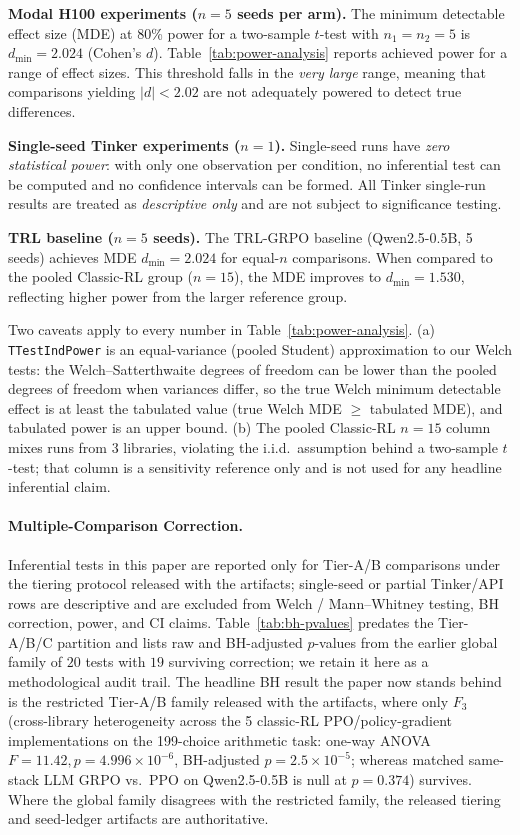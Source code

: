 \textbf{Modal H100 experiments ($n = 5$ seeds per arm).}
The minimum detectable effect size (MDE) at 80\% power for a two-sample
$t$-test with $n_1 = n_2 = 5$ is
$d_{\min} = 2.024$ (Cohen's $d$).
Table~\ref{tab:power-analysis} reports achieved power for a range of effect sizes.
This threshold falls in the \emph{very large} range, meaning that
comparisons yielding $|d| < 2.02$
are not adequately powered to detect true differences.

\textbf{Single-seed Tinker experiments ($n = 1$).}
Single-seed runs have \emph{zero statistical power}: with only one observation per
condition, no inferential test can be computed and no confidence intervals can be
formed.  All Tinker single-run results are treated as \emph{descriptive only} and
are not subject to significance testing.

\textbf{TRL baseline ($n = 5$ seeds).}
The TRL-GRPO baseline (Qwen2.5-0.5B, 5 seeds) achieves MDE
$d_{\min} = 2.024$ for equal-$n$ comparisons.
When compared to the pooled Classic-RL group ($n = 15$), the MDE
improves to $d_{\min} = 1.530$,
reflecting higher power from the larger reference group.

Two caveats apply to every number in Table~\ref{tab:power-analysis}.
(a) \texttt{TTestIndPower} is an equal-variance (pooled Student) approximation to our Welch tests: the Welch--Satterthwaite degrees of freedom can be lower than the pooled degrees of freedom when variances differ, so the true Welch minimum detectable effect is at least the tabulated value (true Welch MDE $\ge$ tabulated MDE), and tabulated power is an upper bound.
(b) The pooled Classic-RL $n = 15$ column mixes runs from $3$ libraries, violating the i.i.d.\ assumption behind a two-sample $t$-test; that column is a sensitivity reference only and is not used for any headline inferential claim.

\paragraph{Multiple-Comparison Correction.}
Inferential tests in this paper are reported only for Tier-A/B
comparisons under the tiering protocol released with the artifacts;
single-seed or partial Tinker/API rows are descriptive and are
excluded from Welch / Mann--Whitney testing, BH correction, power,
and CI claims. Table~\ref{tab:bh-pvalues} predates the Tier-A/B/C
partition and lists raw and BH-adjusted $p$-values from the
earlier global family of $20$ tests with $19$ surviving correction;
we retain it here as a methodological audit trail. The headline
BH result the paper now stands behind is the restricted Tier-A/B
family released with the artifacts, where only $F_3$ (cross-library heterogeneity across the 5 classic-RL PPO/policy-gradient implementations on the 199-choice arithmetic task: one-way ANOVA $F = 11.42, p = 4.996 \times 10^{-6}$, BH-adjusted $p = 2.5 \times 10^{-5}$; whereas matched same-stack LLM GRPO vs.\ PPO on Qwen2.5-0.5B is null at $p = 0.374$) survives. Where
the global family disagrees with the restricted family, the
released tiering and seed-ledger artifacts are authoritative.

